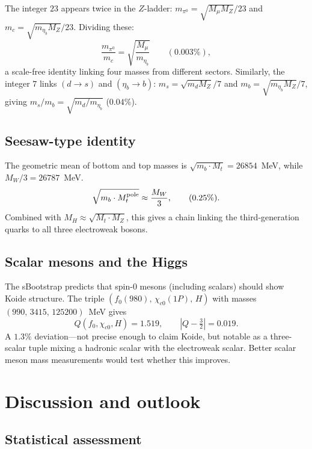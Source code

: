 \documentclass[11pt]{article}
\begin{document}
The integer $23$ appears twice in the $Z$-ladder:
$m_{\pi^0} = \sqrt{M_\mu M_Z}/23$ and
$m_c = \sqrt{m_{\eta_b}M_Z}/23$.
Dividing these:
\begin{equation}
  \frac{m_{\pi^0}}{m_c} = \sqrt{\frac{M_\mu}{m_{\eta_b}}}
  \qquad (0.003\%),
\end{equation}
a scale-free identity linking four masses from different sectors.
Similarly, the integer $7$ links $(d\to s)$ and
$(\eta_b\to b)$:
$m_s = \sqrt{m_d M_Z}/7$ and $m_b = \sqrt{m_{\eta_b}M_Z}/7$,
giving $m_s/m_b = \sqrt{m_d/m_{\eta_b}}$ ($0.04\%$).

\subsection{Seesaw-type identity}

The geometric mean of bottom and top masses is
$\sqrt{m_b\cdot M_t} = 26854$~MeV, while $M_W/3 = 26787$~MeV.
\begin{equation}
  \sqrt{m_b\cdot M_t^{\rm pole}} \approx \frac{M_W}{3},
  \qquad (0.25\%).
\end{equation}
Combined with $M_H \approx \sqrt{M_t\cdot M_Z}$, this gives
a chain linking the third-generation quarks to all three
electroweak bosons.

\subsection{Scalar mesons and the Higgs}

The sBootstrap predicts that spin-0 mesons (including scalars)
should show Koide structure.  The triple
$(f_0(980),\,\chi_{c0}(1P),\,H)$
with masses $(990,\,3415,\,125200)$~MeV gives
\begin{equation}
  Q(f_0,\chi_{c0},H) = 1.519,
  \qquad |Q-\tfrac{3}{2}| = 0.019.
\end{equation}
A $1.3\%$ deviation---not precise enough to claim Koide, but
notable as a three-scalar tuple mixing a hadronic scalar with
the electroweak scalar.  Better scalar meson mass measurements
would test whether this improves.

\section{Discussion and outlook}

\subsection{Statistical assessment}
\end{document}
